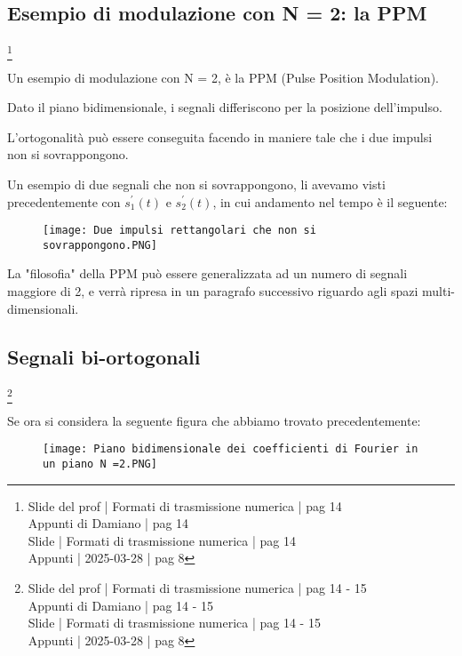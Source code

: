 \newpage 

\subsection{Esempio di modulazione con N = 2: la PPM}
\footnote{Slide del prof | Formati di trasmissione numerica | pag 14 \\  
Appunti di Damiano | pag 14 \\
Slide | Formati di trasmissione numerica | pag  14\\
Appunti | 2025-03-28 | pag 8
}

Un esempio di modulazione con N = 2, è la PPM (Pulse Position Modulation). \newline 

Dato il piano bidimensionale, i segnali differiscono per la posizione dell'impulso. \newline 

L'ortogonalità può essere conseguita facendo in maniere tale che i due impulsi non si sovrappongono. \newline 

Un esempio di due segnali che non si sovrappongono, li avevamo visti precedentemente con $s_1^{'} (t)$ e $s_2^{'} (t)$, 
in cui andamento nel tempo è il seguente: 

\begin{figure}[h]
    \centering
    \texttt{[image: Due impulsi rettangolari che non si sovrappongono.PNG]}
\end{figure}

La "filosofia" della PPM può essere generalizzata ad un numero di segnali maggiore di 2, 
e verrà ripresa in un paragrafo successivo riguardo agli spazi multi-dimensionali. \newline 

\newpage

\subsection{Segnali bi-ortogonali}
\footnote{Slide del prof | Formati di trasmissione numerica | pag 14 - 15\\  
Appunti di Damiano | pag 14 - 15\\
Slide | Formati di trasmissione numerica | pag  14 - 15\\
Appunti | 2025-03-28 | pag 8
}

Se ora si considera la seguente figura che abbiamo trovato precedentemente: 

\begin{figure}[h]
    \centering
    \texttt{[image: Piano bidimensionale dei coefficienti di Fourier in un piano N =2.PNG]}
\end{figure}

